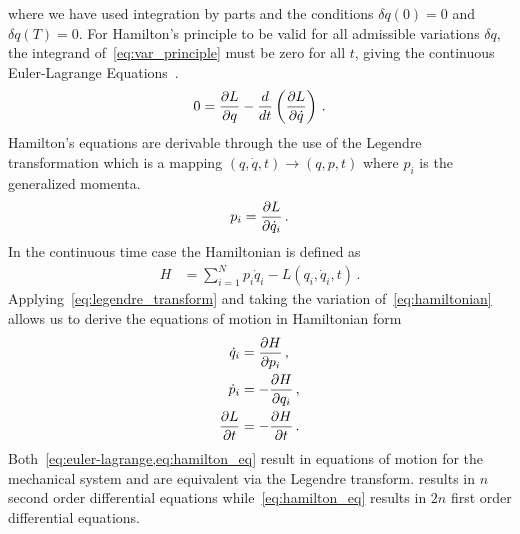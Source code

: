 \documentclass[preprint]{elsarticle}
\begin{document}
where we have used integration by parts and the conditions \( \delta q(0) = 0 \) and \( \delta q(T) = 0\).
For Hamilton's principle to be valid for all admissible variations \( \delta q \), the integrand of~\cref{eq:var_principle} must be zero for all \( t\), giving the continuous Euler-Lagrange Equations~\cite{lanczos1970}.
\begin{align}\label{eq:euler-lagrange}
	0 = \frac{\partial L}{\partial q} - \frac{d}{dt} \left( \frac{\partial L}{\partial \dot{q}} \right) \, .
\end{align}
Hamilton's equations are derivable through the use of the Legendre transformation which is a mapping \( \left( q, \dot{q},t\right) \rightarrow \left(q, p, t \right) \) where \( p_i\) is the generalized momenta.
\begin{align}\label{eq:legendre_transform}
	p_i = \frac{\partial L}{\partial \dot{q}_i} \, .
\end{align}
In the continuous time case the Hamiltonian is defined as
\begin{align}\label{eq:hamiltonian}
	H &= \sum_{i = 1}^N p_i \dot{q}_i - L \left( q_i,\dot{q}_i, t \right) \, .
\end{align}
Applying~\cref{eq:legendre_transform} and taking the variation of~\cref{eq:hamiltonian} allows us to derive the equations of motion in Hamiltonian form
\begin{subequations}\label{eq:hamilton_eq}
\begin{align}
	\dot{q}_i &= \frac{\partial H}{\partial p_i} \, ,\\
	\dot{p}_i &= - \frac{\partial H}{\partial q_i} \, , \\
	\frac{\partial L}{\partial t} &= -\frac{\partial H}{\partial t} \, .
\end{align}
\end{subequations}
Both~\cref{eq:euler-lagrange,eq:hamilton_eq} result in equations of motion for the mechanical system and are equivalent via the Legendre transform.
 results in \( n \) second order differential equations while~\cref{eq:hamilton_eq} results in \( 2n \) first order differential equations.
\end{document}
